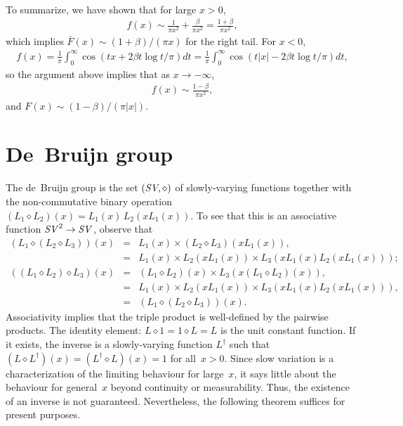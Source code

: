 \documentclass[11pt]{article}
\theoremstyle{definition}
\def\SV{\mathop{\it SV}\nolimits}
\begin{document}
\begin{appendix}
\begin{align*}
	\end{align*}
	To summarize, we have shown that for large $x > 0$,
	\begin{align*}
	f(x) \sim \frac{1}{\pi x^2} + \frac{\beta}{\pi x^2} = \frac{1+\beta}{\pi x^2},
	\end{align*}
	which implies $\bar F(x) \sim (1+\beta)/(\pi x)$ for the right tail.
	For $x<0$, 
	\begin{align*}
	f(x) = \frac{1}{\pi}\int_0^\infty \cos(tx+2\beta t \log t/\pi)dt = \frac{1}{\pi}\int_0^\infty \cos(t|x|-2\beta t \log t/\pi)dt,
	\end{align*}
	so the argument above implies that as $x \to -\infty$,
	\begin{align*}
	f(x) \sim \frac{1-\beta}{\pi x^2},
	\end{align*}
	and $F(x) \sim (1-\beta)/(\pi|x|)$.

    	\section{De~Bruijn group}\label{appDBG}
	The de~Bruijn group is the set $(\SV\!, \diamond)$ of slowly-varying functions together with the 
	non-commutative binary operation $(L_1\diamond L_2)(x) = L_1(x)\, L_2(x L_1(x))$.
	To see that this is an associative function $\SV^2 \to \SV$, observe that
	\begin{eqnarray*}
		(L_1 \diamond (L_2\diamond L_3))(x) &=& L_1(x)\times (L_2\diamond L_3)(x L_1(x)), \\
		&=& L_1(x) \times L_2(x L_1(x))\times L_3(x L_1(x) L_2(xL_1(x)));\\
		((L_1\diamond L_2)\diamond L_3)(x) &=& (L_1\diamond L_2)(x)\times L_3(x(L_1\diamond L_2)(x)),\\
		&=& L_1(x)\times L_2(x L_1(x))\times L_3(xL_1(x) L_2(x L_1(x))), \\
		&=& (L_1 \diamond (L_2\diamond L_3))(x).
	\end{eqnarray*}
	Associativity implies that the triple product is well-defined by the pairwise products.
	The identity element: $L\diamond 1 = 1\diamond L = L$ is the unit constant function.
	If it exists, the inverse is a slowly-varying function $L^\dagger$ such that
	$(L\diamond L^\dagger)(x) =  (L^\dagger\diamond L)(x) =  1$ for all~$x > 0$.
	Since slow variation is a characterization of the limiting behaviour for large~$x$,
	it says little about the behaviour for general~$x$ beyond continuity or measurability.
	Thus, the existence of an inverse is not guaranteed.
	Nevertheless, the following theorem suffices for present purposes.
	

\end{appendix}
\end{document}
